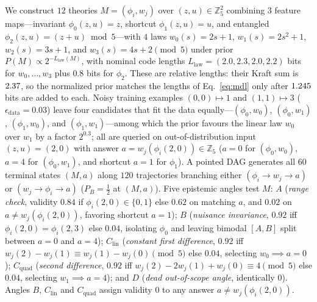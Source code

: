 \documentclass[11pt,a4paper]{article}
\theoremstyle{definition}
\theoremstyle{remark}
\begin{document}
We construct $12$ theories $M = (\phi_i, w_j)$ over $(z, u) \in \mathbb{Z}_5^2$ combining $3$ feature maps---invariant $\phi_0(z, u) = z$, shortcut $\phi_1(z, u) = u$, and entangled $\phi_2(z, u) = (z+u) \bmod 5$---with $4$ laws $w_0(s) = 2s+1$, $w_1(s) = 2s^2+1$, $w_2(s) = 3s+1$, and $w_3(s) = 4s+2 \pmod 5$ under prior $P(M) \propto 2^{-L_{\mathrm{law}}(M)}$, with nominal code lengths $L_{\mathrm{law}} = (2.0, 2.3, 2.0, 2.2)$ bits for $w_0, \dots, w_3$ plus $0.8$ bits for $\phi_2$. These are relative lengths: their Kraft sum is $2.37$, so the normalized prior matches the lengths of Eq.~\eqref{eq:mdl} only after $1.245$ bits are added to each. Noisy training examples $(0,0)\mapsto 1$ and $(1,1)\mapsto 3$ ($\epsilon_{\mathrm{data}} = 0.03$) leave four candidates that fit the data equally---$(\phi_0, w_0)$, $(\phi_0, w_1)$, $(\phi_1, w_0)$, and $(\phi_1, w_1)$---among which the prior favours the linear law $w_0$ over $w_1$ by a factor $2^{0.3}$; all are queried on out-of-distribution input $(z,u) = (2,0)$ with answer $a = w_j(\phi_i(2,0)) \in \mathbb{Z}_5$ ($a=0$ for $(\phi_0, w_0)$, $a=4$ for $(\phi_0, w_1)$, and shortcut $a=1$ for $\phi_1$). A pointed DAG generates all $60$ terminal states $(M, a)$ along $120$ trajectories branching either $(\phi_i \to w_j \to a)$ or $(w_j \to \phi_i \to a)$ ($P_B = \tfrac{1}{2}$ at $(M,a)$). Five epistemic angles test $M$: $A$ (\emph{range check}, validity $0.84$ if $\phi_i(2,0) \in \{0,1\}$ else $0.62$ on matching $a$, and $0.02$ on $a \ne w_j(\phi_i(2,0))$, favoring shortcut $a=1$); $B$ (\emph{nuisance invariance}, $0.92$ iff $\phi_i(2,0) = \phi_i(2,3)$ else $0.04$, isolating $\phi_0$ and leaving bimodal $[A,B]$ split between $a=0$ and $a=4$); $C_{\mathrm{lin}}$ (\emph{constant first difference}, $0.92$ iff $w_j(2)-w_j(1) \equiv w_j(1)-w_j(0) \pmod 5$ else $0.04$, selecting $w_0 \implies a=0$); $C_{\mathrm{quad}}$ (\emph{second difference}, $0.92$ iff $w_j(2)-2w_j(1)+w_j(0) \equiv 4 \pmod 5$ else $0.04$, selecting $w_1 \implies a=4$); and $D$ (\emph{dead out-of-scope angle}, identically $0$). Angles $B$, $C_{\mathrm{lin}}$ and $C_{\mathrm{quad}}$ assign validity $0$ to any answer $a \ne w_j(\phi_i(2,0))$.
\end{document}
